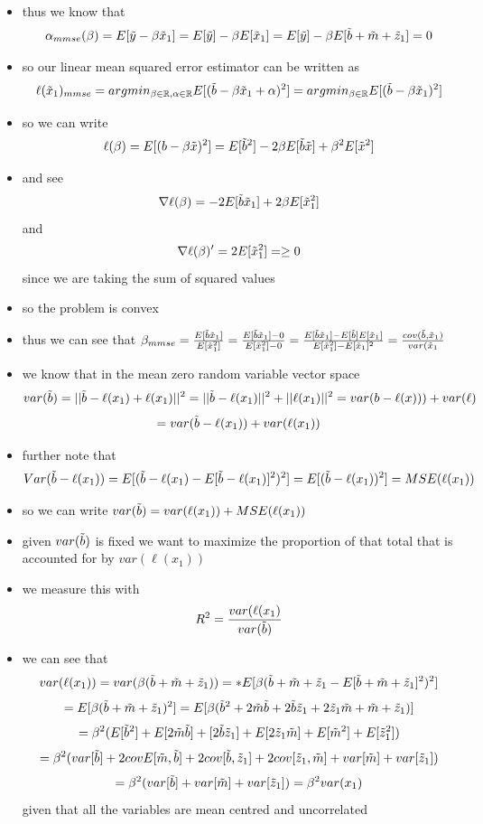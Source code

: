 \documentclass[12pt,twoside]{article}
\begin{document}
\begin{enumerate}
\begin{enumerate}
\begin{itemize}
\begin{itemize}
    \end{itemize}
    \item thus we know that $$\alpha_{mmse}(\beta)=E[\Tilde{y}- \beta \Tilde{x}_1]=E[\Tilde{y}]- \beta E[\Tilde{x}_1]=E[\Tilde{y}]- \beta E[\Tilde{b}+\Tilde{m}+\Tilde{z}_1]=0$$
    \item so our linear mean squared error estimator can be written as $$\ell(\Tilde{x}_1)_{mmse}=argmin_{\beta \in \mathbb{R} , \alpha \in \mathbb{R}}E[( \Tilde{b}-\beta \Tilde{x}_1 + \alpha)^2]=argmin_{\beta \in \mathbb{R}}E[ (\Tilde{b}-\beta \Tilde{x}_1)^2]$$
    \item so we can write $$\ell(\beta)=E[(b-\beta \Tilde{x})^2]=E[\Tilde{b}^2]-2\beta E[\Tilde{b}\Tilde{x}] + \beta^2E[\Tilde{x}^2]$$
    \item and see  $$\nabla \ell(\beta) =-2E[\Tilde{b}\Tilde{x}_1]+2\beta E[\Tilde{x}_1^2] $$
    and $$\nabla \ell(\beta)' =2E[\Tilde{x}_1^2]=\geq 0 $$ since we are taking the sum of squared values 
    \item so the problem is convex
    \item thus we can see that $\beta_{mmse}=\frac{E[\Tilde{b}\Tilde{x}_1]}{E[\Tilde{x}_1^2]}=\frac{E[\Tilde{b}\Tilde{x}_1]-0}{E[\Tilde{x}_1^2]-0}=\frac{E[\Tilde{b}\Tilde{x}_1]-E[\Tilde{b}]E[\Tilde{x}_1]}{E[\Tilde{x}_1^2]-E[\Tilde{x}_1]^2}=\frac{cov(\Tilde{b}, \Tilde{x}_1)}{var(\Tilde{x}_1}$
    \item we know that in the mean zero random variable vector space $$var(\Tilde{b})=||\Tilde{b}-\ell(x_1)+\ell(x_1)||^2=||\Tilde{b}-\ell(x_1)||^2+||\ell(x_1)||^2=var(b-\ell(x)))+var(\ell)$$ $$=var(\Tilde{b}-\ell(x_1))+var(\ell(x_1))$$
    \item further note that $$Var(\Tilde{b}-\ell(x_1))=E[(\Tilde{b}-\ell(x_1) - E[\Tilde{b}-\ell(x_1)]^2)^2]=E[(\Tilde{b}-\ell(x_1))^2]=MSE(\ell(x_1))$$
    \item so we can write $var(\Tilde{b})=var(\ell(x_1))+MSE(\ell(x_1))$
    \item given $var(\Tilde{b})$ is fixed  we want to maximize the proportion of that total that is accounted for by $var(\ell(x_1))$
    \item we measure this with $$R^2=\frac{var(\ell(x_1)}{var(\Tilde{b})}$$
    \item we can see that $$var(\ell(x_1))=var(\beta (\Tilde{b}+\Tilde{m}+\Tilde{z}_1))= *E[\beta (\Tilde{b}+\Tilde{m}+\Tilde{z}_1-E[\Tilde{b}+\Tilde{m}+\Tilde{z}_1]^2)^2]$$
    $$=E[\beta (\Tilde{b}+\Tilde{m}+\Tilde{z}_1)^2]=E[\beta(\Tilde{b}^2 + 2\Tilde{m}\Tilde{b}+2\Tilde{b}\Tilde{z}_1+2\Tilde{z}_1\Tilde{m}+\Tilde{m}+\Tilde{z}_1)]$$ $$=\beta^2(E[\Tilde{b}^2] + E[2\Tilde{m}\Tilde{b}]+[2\Tilde{b}\Tilde{z}_1]+E[2\Tilde{z}_1\Tilde{m}]+E[\Tilde{m}^2]+E[\Tilde{z}_1^2]) $$ $$=\beta^2 (var[\Tilde{b}] + 2covE[\Tilde{m},\Tilde{b}]+2cov[\Tilde{b},\Tilde{z}_1]+2cov[\Tilde{z}_1,\Tilde{m}]+var[\Tilde{m}]+var[\Tilde{z}_1]) $$ $$ =\beta^2 (var[\Tilde{b}] + var[\Tilde{m}]+var[\Tilde{z}_1])=\beta^2 var(x_1)$$ given that all the variables are mean centred and uncorrelated

\end{itemize}
\end{enumerate}
\end{enumerate}
\end{document}
